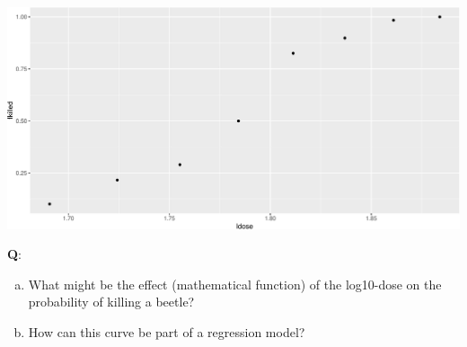 \documentclass[
  ignorenonframetext,
]{beamer}
\newenvironment{Shaded}{\begin{snugshade}}{\end{snugshade}}
\newcommand{\AttributeTok}[1]{\textcolor[rgb]{0.13,0.29,0.53}{#1}}
\newcommand{\CommentTok}[1]{\textcolor[rgb]{0.56,0.35,0.01}{\textit{#1}}}
\newcommand{\FunctionTok}[1]{\textcolor[rgb]{0.13,0.29,0.53}{\textbf{#1}}}
\newcommand{\NormalTok}[1]{#1}
\newcommand{\OtherTok}[1]{\textcolor[rgb]{0.56,0.35,0.01}{#1}}
\newcommand{\SpecialCharTok}[1]{\textcolor[rgb]{0.81,0.36,0.00}{\textbf{#1}}}
\providecommand{\tightlist}{%
  \setlength{\itemsep}{0pt}\setlength{\parskip}{0pt}}
\begin{document}
\begin{frame}[fragile]
\begin{Shaded}
\end{Shaded}

\includegraphics{Module03PresentationWeek1_files/figure-beamer/unnamed-chunk-2-1.pdf}
\end{frame}

\begin{frame}
\textbf{Q}:

\begin{enumerate}
[a.]
\tightlist
\item
  What might be the effect (mathematical function) of the log10-dose on
  the probability of killing a beetle?
\item
  How can this curve be part of a regression model?
\end{enumerate}
\end{frame}
\end{document}
